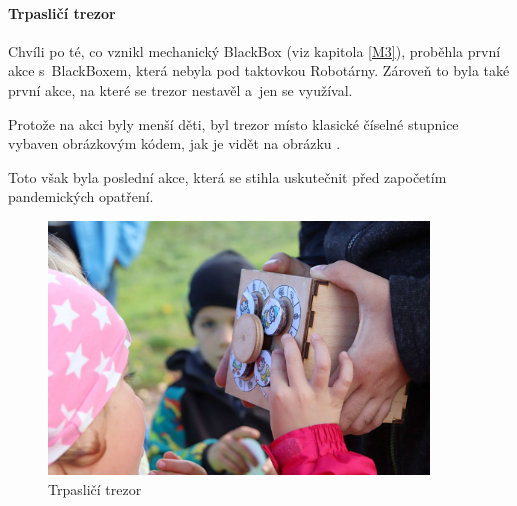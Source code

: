 \paragraph{Trpasličí trezor}
Chvíli po té, co vznikl mechanický BlackBox (viz kapitola \ref{M3}), proběhla první akce s~BlackBoxem, která nebyla pod taktovkou Robotárny. 
Zároveň to byla také první akce, na které se trezor nestavěl a~jen se využíval.

Protože na akci byly menší děti, byl trezor místo klasické číselné stupnice  vybaven obrázkovým kódem, jak je vidět na obrázku . %

Toto však byla poslední akce, která se stihla uskutečnit před započetím pandemických opatření.

\begin{figure}[htbp]
    \centering
    \includegraphics[width=0.9\textwidth]{kapitoly/obrazky/M3/trpaslici.png}
    \caption{Trpasličí trezor}
    \label{fig:M3-trpaslici}
\end{figure}
